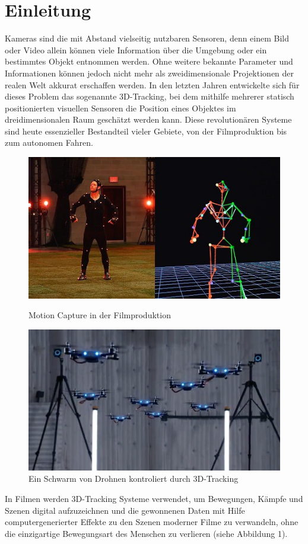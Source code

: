 \documentclass[12pt, ngerman]{article}
\begin{document}
\section{Einleitung}
Kameras sind die mit Abstand vielseitig nutzbaren Sensoren, denn einem Bild oder Video allein können viele Information über die Umgebung oder ein bestimmtes Objekt entnommen werden. Ohne weitere bekannte Parameter und Informationen können jedoch nicht mehr als zweidimensionale Projektionen der realen Welt akkurat erschaffen werden. In den letzten Jahren entwickelte sich für dieses Problem das sogenannte 3D-Tracking, bei dem mithilfe mehrerer statisch positionierten visuellen Sensoren die Position eines Objektes im dreidimensionalen Raum geschätzt werden kann. Diese revolutionären Systeme sind heute essenzieller Bestandteil vieler Gebiete, von der Filmproduktion bis zum autonomen Fahren. \par
\begin{figure}
    \includegraphics[width=\linewidth]{motion_capture_fifa.jpg}
    \caption{Motion Capture in der Filmproduktion}
    \includegraphics[width=\linewidth]{drones.jpg}
    \caption{Ein Schwarm von Drohnen kontroliert durch 3D-Tracking}
\end{figure}
In Filmen werden 3D-Tracking Systeme verwendet, um Bewegungen, Kämpfe und Szenen digital aufzuzeichnen und die gewonnenen Daten mit Hilfe computergenerierter Effekte zu den Szenen moderner Filme zu verwandeln, ohne die einzigartige Bewegungsart des Menschen zu verlieren (siehe Abbildung 1). 
\end{document}
